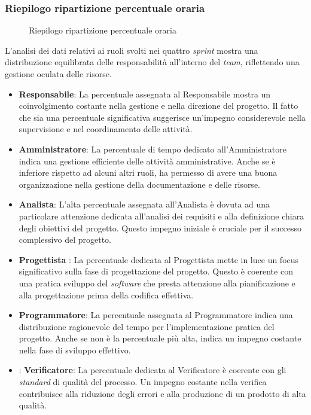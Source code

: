 \subsubsection{Riepilogo ripartizione percentuale oraria}

\begin{figure}[h]
	\centering
	\caption{Riepilogo ripartizione percentuale oraria}
\end{figure}
\newpage

L'analisi dei dati relativi ai ruoli svolti nei quattro \textit{sprint} mostra una distribuzione equilibrata delle responsabilità all'interno del \textit{team}, riflettendo una gestione oculata delle risorse. 
\begin{itemize}
	\item \textbf{Responsabile}: La percentuale assegnata al Responsabile mostra un coinvolgimento costante nella gestione e nella direzione del progetto. Il fatto che sia una percentuale significativa 
	suggerisce un'impegno considerevole nella supervisione e nel coordinamento delle attività.
	\item \textbf{Amministratore}: La percentuale di tempo dedicato all'Amministratore indica una gestione efficiente delle attività amministrative. Anche se è inferiore rispetto ad alcuni altri ruoli, 
	ha permesso di avere una buona organizzazione nella gestione della documentazione e delle risorse.
	\item \textbf{Analista}: L'alta percentuale assegnata all'Analista è dovuta ad una particolare attenzione dedicata all'analisi dei requisiti e alla definizione chiara degli obiettivi del progetto. 
	Questo impegno iniziale è cruciale per il successo complessivo del progetto.
	\item \textbf{Progettista} : La percentuale dedicata al Progettista mette in luce un focus significativo sulla fase di progettazione del progetto. Questo è coerente con una pratica sviluppo del \textit{software} 
	che presta attenzione alla pianificazione e alla progettazione prima della codifica effettiva.
	\item \textbf{Programmatore}: La percentuale assegnata al Programmatore indica una distribuzione ragionevole del tempo per l'implementazione pratica del progetto. Anche se non è la percentuale più alta, 
	indica un impegno costante nella fase di sviluppo effettivo.
	\item: \textbf{Verificatore}: La percentuale dedicata al Verificatore è coerente con gli \textit{standard} di qualità del processo. Un impegno costante nella verifica contribuisce alla riduzione degli errori e 
	alla produzione di un prodotto di alta qualità.
\end{itemize}

